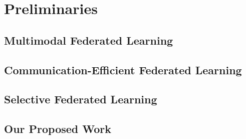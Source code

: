 \documentclass[sigconf]{acmart}
\begin{document}
\section{Preliminaries}

\subsection{Multimodal Federated Learning}

\subsection{Communication-Efficient Federated Learning}

\subsection{Selective Federated Learning}

\subsection{Our Proposed Work}
\end{document}
